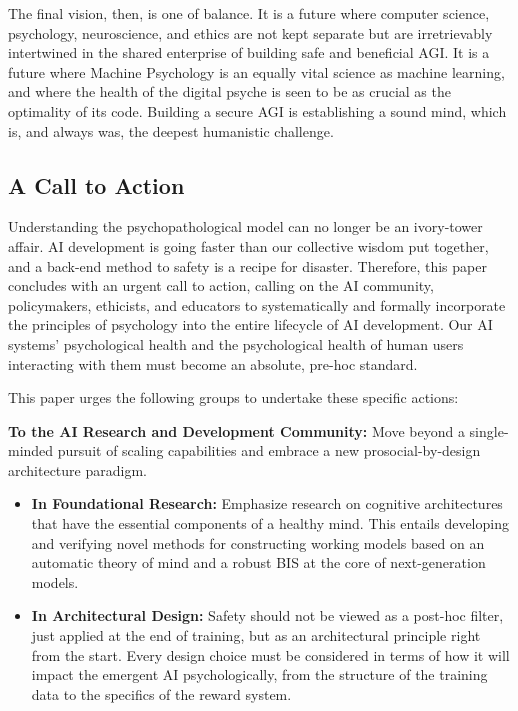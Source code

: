 \documentclass{article}
\begin{document}
The final vision, then, is one of balance. It is a future where computer science, psychology, neuroscience, and ethics are not kept separate but are irretrievably intertwined in the shared enterprise of building safe and beneficial AGI. It is a future where Machine Psychology is an equally vital science as machine learning, and where the health of the digital psyche is seen to be as crucial as the optimality of its code. Building a secure AGI is establishing a sound mind, which is, and always was, the deepest humanistic challenge.

\subsection{A Call to Action}
Understanding the psychopathological model can no longer be an ivory-tower affair. AI development is going faster than our collective wisdom put together, and a back-end method to safety is a recipe for disaster. Therefore, this paper concludes with an urgent call to action, calling on the AI community, policymakers, ethicists, and educators to systematically and formally incorporate the principles of psychology into the entire lifecycle of AI development. Our AI systems' psychological health and the psychological health of human users interacting with them must become an absolute, pre-hoc standard.

This paper urges the following groups to undertake these specific actions:

\textbf{To the AI Research and Development Community:} Move beyond a single-minded pursuit of scaling capabilities and embrace a new prosocial-by-design architecture paradigm.
\begin{itemize}
    \item \textbf{In Foundational Research:} Emphasize research on cognitive architectures that have the essential components of a healthy mind. This entails developing and verifying novel methods for constructing working models based on an automatic theory of mind and a robust BIS at the core of next-generation models.
    \item \textbf{In Architectural Design:} Safety should not be viewed as a post-hoc filter, just applied at the end of training, but as an architectural principle right from the start. Every design choice must be considered in terms of how it will impact the emergent AI psychologically, from the structure of the training data to the specifics of the reward system.
\end{itemize}
\end{document}
